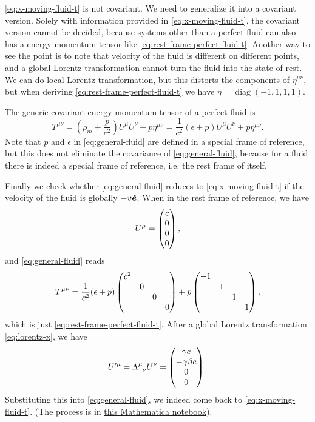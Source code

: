 \documentclass[hyperref, a4paper]{article}
\DeclareMathOperator{\diag}{diag}
\begin{document}
\eqref{eq:x-moving-fluid-t} is not covariant. We need to generalize it into a  
covariant version. Solely with information provided in \eqref{eq:x-moving-fluid-t}, the covariant version 
cannot be decided, because systems other than a perfect fluid can also has a energy-momentum tensor like 
\eqref{eq:rest-frame-perfect-fluid-t}. Another way to see the point is to note that velocity of the fluid is 
different on different points, and a global Lorentz transformation cannot turn the fluid into the state of rest. 
We can do local Lorentz transformation, but this distorts the components of $\eta^{\mu \nu}$, but when deriving 
\eqref{eq:rest-frame-perfect-fluid-t} we have $\eta = \diag(-1, 1, 1, 1)$.  

The generic covariant energy-momentum tensor of a perfect fluid is %
\begin{equation}
    T^{\mu \nu} = \left( \rho_m + \frac{p}{c^2} \right) U^\mu U^\nu + p \eta^{\mu \nu} = \frac{1}{c^2} \left( \epsilon + p \right) U^\mu U^\nu + p \eta^{\mu \nu}.
    \label{eq:general-fluid}
\end{equation}
Note that $p$ and $\epsilon$ in \eqref{eq:general-fluid} are defined in a special frame of reference, but this does 
not eliminate the covariance of \eqref{eq:general-fluid}, because for a fluid there is indeed a special frame of reference, i.e. the rest frame of itself. 

Finally we check whether \eqref{eq:general-fluid} reduces to \eqref{eq:x-moving-fluid-t} if the velocity 
of the fluid is globally $- v \vu*{e}$. When in the rest frame of reference, we have 
\begin{equation}
    U^\mu = \pmqty{c \\ 0 \\ 0 \\ 0},
\end{equation}
and \eqref{eq:general-fluid} reads 
\[
    T^{\mu \nu} = \frac{1}{c^2} (\epsilon + p) \pmqty{\dmat{c^2, 0, 0, 0}} + p \pmqty{\dmat{-1, 1, 1, 1}}, 
\]
which is just \eqref{eq:rest-frame-perfect-fluid-t}. After a global Lorentz transformation \eqref{eq:lorentz-x}, 
we have 
\[
    U'^\mu = \Lambda\indices{^\mu_\nu} U^\nu = \pmqty{\gamma c \\ - \gamma \beta c \\ 0 \\ 0}.
\]
Substituting this into \eqref{eq:general-fluid}, we indeed come back to \eqref{eq:x-moving-fluid-t}. (The process is in \href{relativistic-ideal-fluid.nb}{this Mathematica notebook}). 
\end{document}

